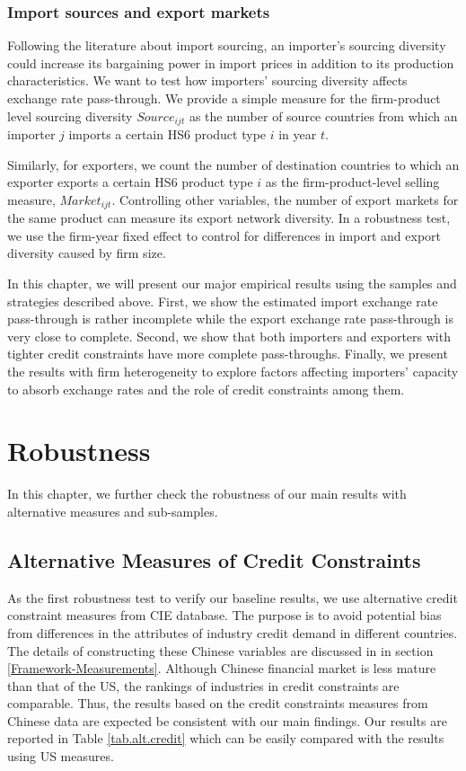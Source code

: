\documentclass[12pt]{article}
\begin{document}
\subsubsection{Import sources and export markets}
Following the literature about import sourcing, an importer's sourcing diversity could increase its bargaining power in import prices in addition to its production characteristics. We want to test how importers' sourcing diversity affects exchange rate pass-through. We provide a simple measure for the firm-product level sourcing diversity $Source_{ijt}$ as the number of source countries from which an importer $j$ imports a certain HS6 product type $i$ in year $t$. 

Similarly, for exporters, we count the number of destination countries to which an exporter exports a certain HS6 product type $i$ as the firm-product-level selling measure, $Market_{ijt}$. Controlling other variables, the number of export markets for the same product can measure its export network diversity. In a robustness test, we use the firm-year fixed effect to control for differences in import and export diversity caused by firm size.

In this chapter, we will present our major empirical results using the samples and strategies described above. First, we show the estimated import exchange rate pass-through is rather incomplete while the export exchange rate pass-through is very close to complete. Second, we show that both importers and exporters with tighter credit constraints have more complete pass-throughs. Finally, we present the results with firm heterogeneity to explore factors affecting importers' capacity to absorb exchange rates and the role of credit constraints among them.



\section{Robustness} \label{Robustness}

In this chapter, we further check the robustness of our main results with alternative measures and sub-samples.

\subsection{Alternative Measures of Credit Constraints}

As the first robustness test to verify our baseline results, we use alternative credit constraint measures from CIE database. The purpose is to avoid potential bias from differences in the attributes of industry credit demand in different countries. The details of constructing these Chinese variables are discussed in in section \ref{Framework-Measurements}. Although Chinese financial market is less mature than that of the US, the rankings of industries in credit constraints are comparable. Thus, the results based on the credit constraints measures from Chinese data are expected be consistent with our main findings. Our results are reported in Table \ref{tab.alt.credit} which can be easily compared with the results using US measures.
\end{document}
